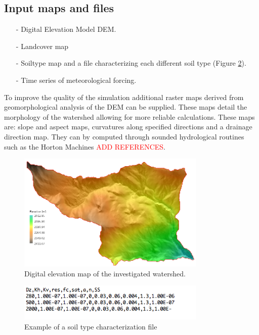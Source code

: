 \subsection{Input maps and files}
\begin{itemize}
\item [-] Digital Elevation Model DEM.
\item [-] Landcover map
\item [-] Soiltype map and a file characterizing each different soil type (Figure \ref{soilT}).
\item [-] Time series of meteorological forcing.
\end{itemize}
To improve the quality of the simulation additional raster maps derived from geomorphological analysis of the DEM can be supplied. These maps detail the morphology of the watershed allowing for more reliable calculations. These maps are: slope and aspect maps, curvatures along specified directions and a drainage direction map. They can by computed through sounded hydrological routines such as the Horton Machines \textcolor {red} {ADD REFERENCES}.
\begin{figure}[h!]
\begin{center}
   \includegraphics[width=0.8\textwidth]{./images/pic_template/dem_duron.png}
    \caption{Digital elevation map of the investigated watershed.} \label{dem}
\end{center}
\end{figure}

\begin{figure}[h!]
\begin{center}
   \includegraphics[width=0.8\textwidth]{./images/pic_template/soilType1.png}
    \caption{Example of a soil type characterization file} \label{soilT}
\end{center}
\end{figure}

